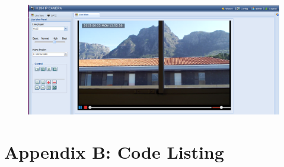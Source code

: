 \documentclass[a4paper,11pt]{report}
\begin{document}
\begin{figure}[h]
 \begin{center}
   \includegraphics[scale=0.34]{live}
 \end{center}
\end{figure}

\newpage
\section*{Appendix B: Code Listing}

\lstset{escapechar=@,style=customc}

\end{document}
